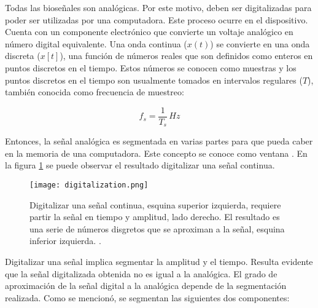 Todas las bioseñales son analógicas. Por este motivo, deben ser digitalizadas para poder ser utilizadas por una computadora. Este proceso ocurre en el dispositivo. Cuenta con un componente electrónico que convierte un voltaje analógico en número digital equivalente. Una onda continua ($ x(t) $) se convierte en una onda discreta ($x[t]$), una función de números reales que son definidos como enteros en puntos discretos en el tiempo. Estos números se conocen como muestras y los puntos discretos en el tiempo son usualmente tomados en intervalos regulares ($T$), también conocida como frecuencia de muestreo:

$$ f_{s} = \frac{1}{T_{s}}\, Hz $$

Entonces, la señal analógica es segmentada en varias partes para que pueda caber en la memoria de una computadora. Este concepto se conoce como ventana \cite{biosignal-book}. En la figura \ref{fig:digitalization} se puede observar el resultado digitalizar una señal continua.

\begin{figure}[H]
	\centering
    \texttt{[image: digitalization.png]}
    \caption{Digitalizar una señal continua, esquina superior izquierda, requiere partir la señal en tiempo y amplitud, lado derecho. El resultado es una serie de números disgretos que se aproximan a la señal, esquina inferior izquierda.  \cite{biosignal-book}.}
	\label{fig:digitalization}
\end{figure}

Digitalizar una señal implica segmentar la amplitud y el tiempo. Resulta evidente que la señal digitalizada obtenida no es igual a la analógica. El grado de aproximación de la señal digital a la analógica depende de la segmentación realizada. Como se mencionó, se segmentan las siguientes dos componentes:

